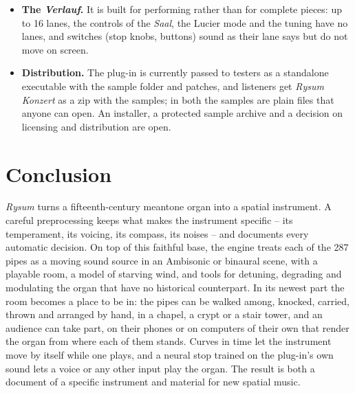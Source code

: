 \documentclass[11pt,a4paper,parskip=half,DIV=11,toc=bibliography]{scrartcl}
\newcommand{\ui}[1]{\emph{#1}}                 %
\begin{document}
\begin{itemize}
        tuning of its default level and tracker settings, are still to be done \citep{neuralrysum2}.
  \item \textbf{The \ui{Verlauf}.} It is built for performing rather than for complete pieces: up to 16 lanes, the controls of the \ui{Saal}, the Lucier
        mode and the tuning have no lanes, and switches (stop knobs, buttons) sound as their lane says but do not move on screen.
  \item \textbf{Distribution.} The plug-in is currently passed to testers as a standalone executable with
        the sample folder and patches, and listeners get \emph{Rysum Konzert} as a zip with the samples; in both the samples are plain files that anyone
        can open. An installer, a protected sample archive and a decision on licensing and distribution are open.
\end{itemize}

\section{Conclusion}

\emph{Rysum} turns a fifteenth-century meantone organ into a spatial instrument. A careful preprocessing
keeps what makes the instrument specific -- its temperament, its voicing, its compass, its noises -- and
documents every automatic decision. On top of this faithful base, the engine treats each of the 287 pipes
as a moving sound source in an Ambisonic or binaural scene, with a playable room, a model of starving wind,
and tools for detuning, degrading and modulating the organ that have no historical counterpart. In its newest part the
room becomes a place to be in: the pipes can be walked among, knocked, carried, thrown and arranged by hand, in a chapel, a crypt or a stair
tower, and an audience can take part, on their phones or on computers of their own that render the organ from where each of them stands.
Curves in time let the instrument move by itself while one plays, and a neural stop trained on the plug-in's own sound lets a voice or any other
input play the organ. The result is
both a document of a specific instrument and material for new spatial music.




\clearpage
\appendix

\clearpage
\end{document}
